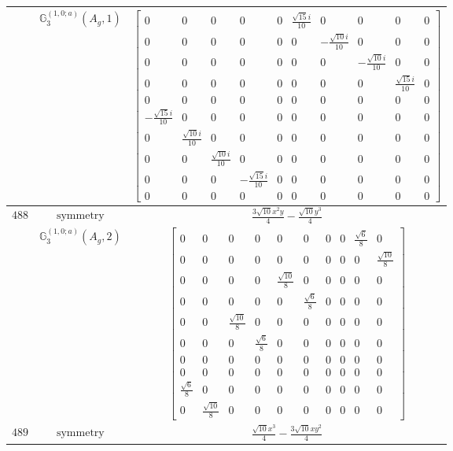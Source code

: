 \documentclass[fleqn,8pt,landscape]{jsarticle}
\begin{document}
\begin{longtable}{ccc}
$  $ & $ \mathbb{G}_{3}^{(1,0;a)}(A_{g},1) $ & $ \begin{bmatrix} 0 & 0 & 0 & 0 & 0 & \frac{\sqrt{15} i}{10} & 0 & 0 & 0 & 0 \\ 0 & 0 & 0 & 0 & 0 & 0 & - \frac{\sqrt{10} i}{10} & 0 & 0 & 0 \\ 0 & 0 & 0 & 0 & 0 & 0 & 0 & - \frac{\sqrt{10} i}{10} & 0 & 0 \\ 0 & 0 & 0 & 0 & 0 & 0 & 0 & 0 & \frac{\sqrt{15} i}{10} & 0 \\ 0 & 0 & 0 & 0 & 0 & 0 & 0 & 0 & 0 & 0 \\ - \frac{\sqrt{15} i}{10} & 0 & 0 & 0 & 0 & 0 & 0 & 0 & 0 & 0 \\ 0 & \frac{\sqrt{10} i}{10} & 0 & 0 & 0 & 0 & 0 & 0 & 0 & 0 \\ 0 & 0 & \frac{\sqrt{10} i}{10} & 0 & 0 & 0 & 0 & 0 & 0 & 0 \\ 0 & 0 & 0 & - \frac{\sqrt{15} i}{10} & 0 & 0 & 0 & 0 & 0 & 0 \\ 0 & 0 & 0 & 0 & 0 & 0 & 0 & 0 & 0 & 0 \end{bmatrix} $ \\ \hline
$ 488 $ & $ \text{symmetry} $ & $ \frac{3 \sqrt{10} x^{2} y}{4} - \frac{\sqrt{10} y^{3}}{4} $ \\
$  $ & $ \mathbb{G}_{3}^{(1,0;a)}(A_{g},2) $ & $ \begin{bmatrix} 0 & 0 & 0 & 0 & 0 & 0 & 0 & 0 & \frac{\sqrt{6}}{8} & 0 \\ 0 & 0 & 0 & 0 & 0 & 0 & 0 & 0 & 0 & \frac{\sqrt{10}}{8} \\ 0 & 0 & 0 & 0 & \frac{\sqrt{10}}{8} & 0 & 0 & 0 & 0 & 0 \\ 0 & 0 & 0 & 0 & 0 & \frac{\sqrt{6}}{8} & 0 & 0 & 0 & 0 \\ 0 & 0 & \frac{\sqrt{10}}{8} & 0 & 0 & 0 & 0 & 0 & 0 & 0 \\ 0 & 0 & 0 & \frac{\sqrt{6}}{8} & 0 & 0 & 0 & 0 & 0 & 0 \\ 0 & 0 & 0 & 0 & 0 & 0 & 0 & 0 & 0 & 0 \\ 0 & 0 & 0 & 0 & 0 & 0 & 0 & 0 & 0 & 0 \\ \frac{\sqrt{6}}{8} & 0 & 0 & 0 & 0 & 0 & 0 & 0 & 0 & 0 \\ 0 & \frac{\sqrt{10}}{8} & 0 & 0 & 0 & 0 & 0 & 0 & 0 & 0 \end{bmatrix} $ \\ \hline
$ 489 $ & $ \text{symmetry} $ & $ \frac{\sqrt{10} x^{3}}{4} - \frac{3 \sqrt{10} x y^{2}}{4} $ \\

\end{longtable}
\end{document}
